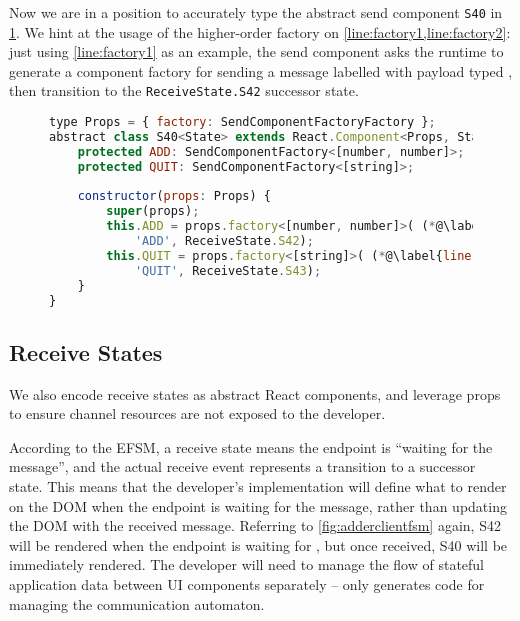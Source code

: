 Now we are in a position to accurately type the abstract
send component \texttt{S40} in \cref{lst:reactsendcomponent}.
We hint at the usage of the higher-order factory on
\cref{line:factory1,line:factory2}:
just using \cref{line:factory1} as an example,
the send component asks the runtime to generate a 
component factory for sending a message 
labelled 
with payload typed
,
then transition to the \texttt{ReceiveState.S42}
successor state.

\begin{figure}[!h]
\begin{lstlisting}[language=javascript,tabsize=2]
type Props = { factory: SendComponentFactoryFactory };
abstract class S40<State> extends React.Component<Props, State> {
	protected ADD: SendComponentFactory<[number, number]>;
	protected QUIT: SendComponentFactory<[string]>;
	
	constructor(props: Props) {
		super(props);
		this.ADD = props.factory<[number, number]>( (*@\label{line:factory1}@*)
			'ADD', ReceiveState.S42);
		this.QUIT = props.factory<[string]>( (*@\label{line:factory2}@*)
			'QUIT', ReceiveState.S43);
	}
}
\end{lstlisting}
\label{lst:reactsendcomponent}
\end{figure}

\subsection{Receive States}

We also encode receive states as abstract React components,
and leverage props to ensure channel resources are not exposed
to the developer.

According to the EFSM, a receive state means
the endpoint is ``waiting for the message'',
and the actual receive event represents a transition
to a successor state.
This means that the developer's implementation will define
what to render on the DOM when the endpoint is waiting
for the message, rather than updating the DOM with the
received message.
Referring to \cref{fig:adderclientfsm} again,
S42 will be rendered when the endpoint is waiting for
, but once received, S40 will be immediately
rendered. The developer will need to manage the flow
of stateful application data between UI components separately
--  only generates code for managing
the communication automaton.

